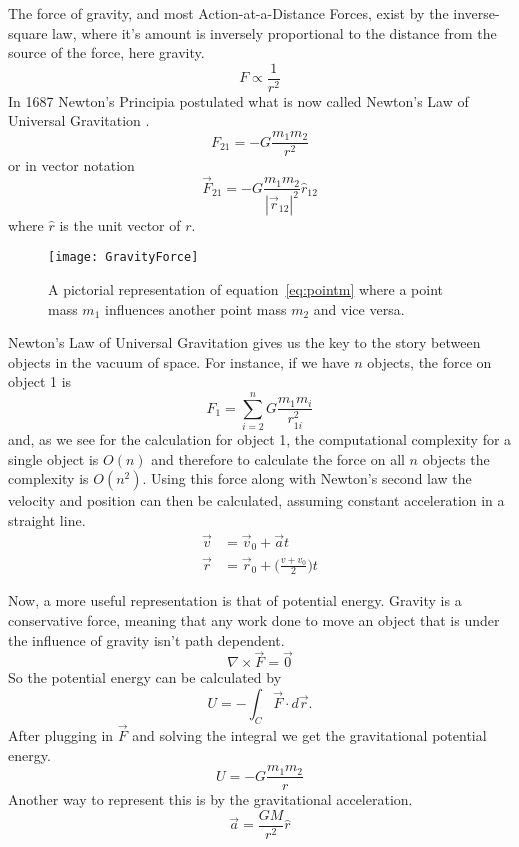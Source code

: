 The force of gravity, and most Action-at-a-Distance Forces, exist by the inverse-square law, where it's amount is inversely proportional to the distance from the source of the force, here gravity. $$F\propto \frac{1}{r^2}$$ In 1687 Newton's Principia postulated what is now called Newton's Law of Universal Gravitation \cite{rohrlich_1999}. $$F_{21}=-G\frac{m_1m_2}{r^2}$$ or in vector notation 
\begin{equation}\label{eq:pointm}
\vec{F}_{21}=-G\frac{m_1m_2}{|\vec{r}_{12}|^2}\hat{r}_{12}
\end{equation}
 where $\hat{r}$ is the unit vector of $r$.
 
 \begin{figure}
 	\centering
 	\texttt{[image: GravityForce]}
 	\caption{A pictorial representation of equation~\ref{eq:pointm} where a point mass $m_1$ influences another point mass $m_2$ and vice versa.}
 \end{figure}

Newton's Law of Universal Gravitation gives us the key to the story between objects in the vacuum of space. For instance, if we have $n$ objects, the force on object 1 is $$F_1=\sum_{i=2}^n{G\frac{m_1 m_i}{r_{1i}^2}}$$ and, as we see for the calculation for object 1, the computational complexity for a single object is $O(n)$ and therefore to calculate the force on all $n$ objects the complexity is $O(n^2)$. Using this force along with Newton's second law the velocity and position can then be calculated, assuming constant acceleration in a straight line.
\begin{align}
	\vec{v} &= \vec{v}_0+\vec{a}t \label{eq:vel}\\
	\vec{r} &= \vec{r}_0+\Big(\frac{v+v_0}{2}\Big)t\label{eq:pos}
\end{align}

Now, a more useful representation is that of potential energy. Gravity is a conservative force, meaning that any work done to move an object that is under the influence of gravity isn't path dependent. $$\nabla\times \vec{F}=\vec{0}$$ 
So the potential energy can be calculated by $$U=-\int_C \vec{F}\cdot d\vec{r}.$$ After plugging in $\vec{F}$ and solving the integral we get the gravitational potential energy.
\begin{equation} \label{eq:gravpotential}
U=-G\frac{m_1m_2}{r}
\end{equation}
Another way to represent this is by the gravitational acceleration. 
\begin{equation}
\vec{a}=\frac{GM}{r^2}\hat{r}
\end{equation}

